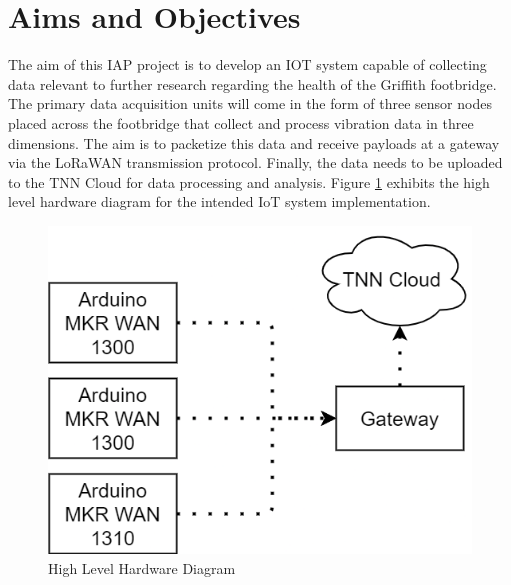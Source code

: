 \section{Aims and Objectives}
The aim of this IAP project is to develop an IOT system capable of collecting data relevant to further research regarding the health of the Griffith footbridge. The primary data acquisition units will come in the form of three sensor nodes placed across the footbridge that collect and process vibration data in three dimensions. The aim is to packetize this data and receive payloads at a gateway via the LoRaWAN transmission protocol. Finally, the data needs to be uploaded to the TNN Cloud for data processing and analysis. Figure \ref{fig:HL-HW-Diagram} exhibits the high level hardware diagram for the intended IoT system implementation. 


\begin{figure}[h!]
\center
\includegraphics[scale=0.5]{Images/HW-Diagram.png}
\caption{High Level Hardware Diagram}
\label{fig:HL-HW-Diagram}
\end{figure}

